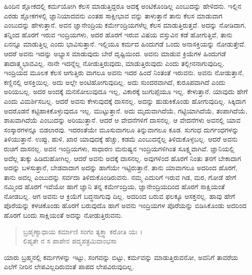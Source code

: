 ಹಿಂದಿನ ಶ್ಲೋಕದಲ್ಲಿ ಕರ್ಮಯೋಗಿ ಕೆಲಸ ಮಾಡುತ್ತಿದ್ದರೂ ಅದಕ್ಕೆ ಅಂಟಿಕೊಂಡಿಲ್ಲ ಎಂಬುದನ್ನು ಹೇಳಿದನು. ಇಲ್ಲಿನ ಎರಡು ಶ್ಲೋಕಗಳಲ್ಲಿ ಜ್ಞಾನಿಯಾದವನು ಎಂತಹ ಸಾಕ್ಷೀಭಾವ ವನ್ನು ತಾಳುತ್ತಾನೆ ತಾನು ಕೆಲಸ ಮಾಡುವಾಗ ಎಂಬುದನ್ನು ಹೇಳುತ್ತಾನೆ. ಅವನ ಜ್ಞಾನೇಂದ್ರಿಯ ಕರ್ಮೇಂದ್ರಿಯಗಳೆಲ್ಲ ಕೆಲಸ ಮಾಡುತ್ತಿರುತ್ತವೆ. ಅದನ್ನು ನೋಡಿದಾಗ, ತನ್ನಿಂದ ಹೊರಗೆ ಇರುವ ಇಂದ್ರಿಯಗಳು, ಅದರ ಹೊರಗೆ ಇರುವ ವಿಷಯ ವಸ್ತುವಿನ ಕಡೆ ಹೋಗುತ್ತಿವೆ, ತಾನು ಏನನ್ನೂ ಮಾಡುತ್ತಿಲ್ಲ ಎಂದು ಭಾವಿಸುತ್ತಾನೆ. ಇಲ್ಲಿಯೂ ಕರ್ಮದ ಹಿಂದುಗಡೆ ಒಂದು ಅನಾಸಕ್ತಿಯನ್ನು ನೋಡುತ್ತೇವೆ. ಆದರೆ ಅವನು ಇದನ್ನು ಅಭ್ಯಾಸ ಮಾಡುವುದು ಬೇರೆ ದೃಷ್ಟಿಯಿಂದ. ಅವನು ಮಾಡುವ ಕ್ರಿಯೆಗಳ ಹಿಂದುಗಡೆ ತಾದಾತ್ಮ್ಯಭಾವವಿಲ್ಲ. ನಾನೇ ಇದನ್ನೆಲ್ಲ ನೋಡುತ್ತಿರುವುದು, ಮಾಡುತ್ತಿರುವುದು ಎಂದು ತಲ್ಲೀನನಾಗುವುದಿಲ್ಲ. ಇಂದ್ರಿಯದ ಮೂಲಕ ಕೆಲಸ ಆಗುತ್ತಿರು ವಾಗಲೂ ಅವನು ಇದರ ಹಿಂದೆ ನಿಂತಂತೆ ಇರುವನು. ಅವನು ನೋಡುತ್ತಾನೆ, ಕಣ್ಣಿನಲ್ಲಿ ಆಸಕ್ತಿಯಿಲ್ಲ. ಅದು ಅಲ್ಲೇ ಅಂಟಿಹೋಗುವುದಿಲ್ಲ. ಅದು ಸುಂದರವಾಗಿದೆ, ಕುರೂಪವಾಗಿದೆ ಎಂದು ಅರಿಯಬಲ್ಲ. ಅದರ ಅಂದಕ್ಕೆ ಮನಸೋಲುವುದೂ ಇಲ್ಲ, ವಿಕಾರಕ್ಕೆ ಜುಗುಪ್ಸೆಯೂ ಇಲ್ಲ. ಕೇಳುತ್ತಾನೆ. ಯಾವುದು ಹೇಗೆ ಎಂದು ವಿಮರ್ಶಿಸಬಲ್ಲ. ಆದರೆ ಅವನು ಕೇಳುವುದಕ್ಕೆ ದಾಸನಲ್ಲ. ಅದನ್ನು ಹುಡುಕಿಕೊಂಡು ಹೋಗುವುದಿಲ್ಲ. ಸಿಕ್ಕಿದಾಗ ಅದರೊಡನೆ ಕಟ್ಟಿಹಾಕಿಕೊಳ್ಳುವುದೂ ಇಲ್ಲ. ಮುಟ್ಟುತ್ತಾನೆ. ಅದು ಮೃದುವಾಗಿದೆಯೆ, ಗಟ್ಟಿಯಾಗಿದೆಯೆ, ತಂಪಾಗಿದೆಯೆ, ಶಾಖವಾಗಿದೆಯೆ ಎಂಬುದನ್ನು ಅರಿಯುತ್ತಾನೆ. ಆದರೆ ಆ ವೇದನೆಗಳಿಗೆ ದಾಸನಲ್ಲ. ಆ ವೇದನೆಗಳು ಅವನಲ್ಲಿ ಯಾವ ಸಂಸ್ಕಾರಗಳನ್ನೂ ಬಿಡಲಾರವು. ಇದರಂತೆಯೇ ಮೂಸುವಾಗಲೂ ತಿನ್ನುವಾಗಲೂ ಕೂಡ. ಸುಗಂಧ ದುರ್ಗಂಧಗಳನ್ನು ತಿಳಿಯುತ್ತಾನೆ. ಉಪ್ಪು, ಹುಳಿ, ಖಾರ ಯಾವುದಕ್ಕೆ ಹೆಚ್ಚು, ಕಡಮೆ ಎಂಬುದನ್ನೆಲ್ಲ ತಿಳಿದುಕೊಳ್ಳಬಲ್ಲ. ಆದರೆ ಅವನು ರುಚಿಗೆ ದಾಸನಲ್ಲ. ಅವನ ಇಂದ್ರಿಯಗಳು, ಸಾಧಾರಣ ಮನುಷ್ಯನ ಇಂದ್ರಿಯಗಳಿಗಿಂತ ಸೂಕ್ಷ್ಮವಾಗಿವೆ. ಜ್ಞಾನಿಯಲ್ಲಿ ಅದೆಲ್ಲ ತುಕ್ಕು ಹಿಡಿದುಹೋಗಿಲ್ಲ. ಆದರೆ ಅವನು ಅದಕ್ಕೆ ದಾಸನಲ್ಲ. ಅವುಗಳಿಂದ ಹೊರಗೆ ನಿಂತು ತನಗೆ ಬೇಕಾದಾಗ ಅದನ್ನು ಬಳಸುತ್ತಾನೆ, ಬೇಡವಾದಾಗ ಅದನ್ನು ಹಾಗೆಯೇ ಇಟ್ಟಿರುತ್ತಾನೆ. ತಾನು ಯಾವಾಗಲೂ ಅದರಿಂದ ಹೊರಗೆ, ತಾನು ಅದಲ್ಲ ಎಂಬುದನ್ನು ಸರ್ವದಾ ತಿಳಿದುಕೊಂಡಿರುವನು. ನಮ್ಮ ಎದುರಿಗೆ ಇರುವ ಗಿಡ, ಮರ, ಗೋಡೆ ಹೇಗೆ ನಮ್ಮಿಂದ ಹೊರಗೆ ಇವೆಯೋ ಹಾಗೆ ಜ್ಞಾನಿ ತನ್ನ ಕರ್ಮೇಂದ್ರಿಯ, ಜ್ಞಾನೇಂದ್ರಿಯದಿಂದ ಹೊರಗೆ ಸಾಕ್ಷಿಯಂತೆ ನೋಡಬಲ್ಲ. ಆಗ ಅವನು ಆ ಕ್ರಿಯೆಗೆ ಬದ್ಧನಾಗುವು ದಿಲ್ಲ. ಅದರಿಂದ ಬರುವ ಫಲಕ್ಕೂ ಆಸಕ್ತನಲ್ಲ. ಹಾವು ಹೇಗೆ ಪೊರೆಯನ್ನು ಕಳಚಿಕೊಂಡು ಹೊರಗೆ ಬರುವುದೊ ಹಾಗೆ ಅವನು ಇಂದ್ರಿಯಗಳ ಪೊರೆಯನ್ನು ಬಿಡಿಸಿಕೊಂಡು ಅದರಿಂದ ಹೊರಗೆ ಬಂದು ಸಾಕ್ಷಿಯಂತೆ ಅದನ್ನು ನೋಡುತ್ತಿರುವನು.

\begin{verse}
ಬ್ರಹ್ಮಣ್ಯಾಧಾಯ ಕರ್ಮಾಣಿ ಸಂಗಂ ತ್ಯಕ್ತ್ವಾ ಕರೋತಿ ಯಃ ।\\ಲಿಪ್ಯತೇ ನ ಸ ಪಾಪೇನ ಪದ್ಮಪತ್ರಮಿವಾಂಭಸಾ 
\end{verse}

{\small ಯಾರು ಬ್ರಹ್ಮನಲ್ಲಿ ಕರ್ಮಗಳನ್ನು ಇಟ್ಟು, ಸಂಗವನ್ನು ಬಿಟ್ಟು, ಕರ್ಮವನ್ನು ಮಾಡುತ್ತಿರುವನೋ, ಅವನಿಗೆ ತಾವರೆಯ ಎಲೆಗೆ ನೀರಿನ ಲೇಪವಿಲ್ಲದಿರುವಂತೆ ಪಾಪದ ಲೇಪವಿರುವುದಿಲ್ಲ.}

